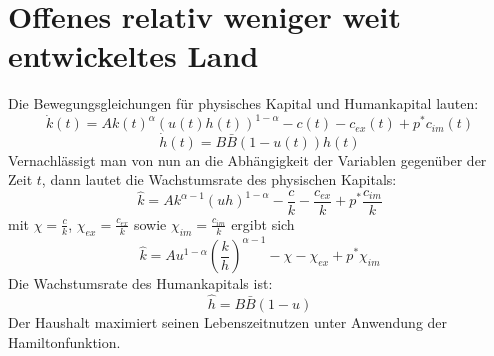 \section[Offenes relativ weniger weit entwickeltes Land]{Offenes relativ weniger weit entwickeltes Land }\label{APPENDIXEL}
Die Bewegungsgleichungen für physisches Kapital und Humankapital lauten:
\begin{equation}
\dot{k}(t)=Ak(t)^\alpha(u(t)h(t))^{1-\alpha}-c(t)-c_{ex}(t)+p^*c_{im}(t)
\end{equation}
\vspace{-0.7cm}
\begin{equation}
\dot{h}(t)=B\bar{B}(1-u(t))h(t)
\end{equation}
Vernachlässigt man von nun an die Abhängigkeit der Variablen gegenüber der Zeit $t$, dann lautet die Wachstumsrate des physischen Kapitals:
\begin{equation*}
\hat{k}=A k^{\alpha-1}(uh)^{1-\alpha}-\frac{c}{k}-\frac{c_{ex}}{k}+p^*\frac{c_{im}}{k}
\end{equation*}
mit $\chi=\frac{c}{k}$, $\chi_{ex}=\frac{c_{ex}}{k}$ sowie $\chi_{im}=\frac{c_{im}}{k}$ ergibt sich
\begin{equation}
\boxed{\hat{k}=A u^{1-\alpha}\left(\frac{k}{h}\right)^{\alpha-1}-\chi-\chi_{ex}+p^*\chi_{im}}
\end{equation}
Die Wachstumsrate des Humankapitals ist: 
\begin{equation}
\hat{h}=B\bar{B}(1-u)
\end{equation}
Der Haushalt maximiert seinen Lebenszeitnutzen unter Anwendung der Hamiltonfunktion.\\
